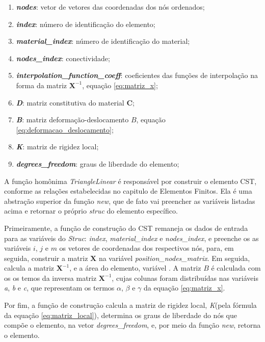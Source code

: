 \begin{enumerate}
    \item \textbf{\emph{nodes}}: vetor de vetores das coordenadas dos nós ordenados;
   \item \textbf{\emph{index}}: número de identificação do elemento;
   \item \textbf{\emph{material\_index}}: número de identificação do material;
   \item \textbf{\emph{nodes\_index}}: conectividade;
   \item \textbf{\emph{interpolation\_function\_coeff}}: coeficientes das funções de interpolação na forma da matriz $\bm{X}^{-1}$, equação \ref{eq:matriz_x};
   \item \textbf{\emph{D}}: matriz constitutiva do material $\bm{C}$;
   \item \textbf{\emph{B}}: matriz deformação-deslocamento $B$, equação \ref{eq:deformacao_deslocamento};
   \item \textbf{\emph{K}}: matriz de rigidez local;
   \item \textbf{\emph{degrees\_freedom}}: graus de liberdade do elemento;
\end{enumerate}

A função homônima \emph{TriangleLinear} é responsável por construir o elemento CST, conforme as relações estabelecidas no capitulo de Elementos Finitos. Ela é uma abstração superior da função \emph{new}, que de fato vai preencher as variáveis listadas acima e retornar o próprio \emph{struc} do elemento específico.

Primeiramente, a função de construção do CST remaneja os dados de entrada para as variáveis do \emph{Struc}: \emph{index}, \emph{material\_index} e \emph{nodes\_index}, e preenche os as variáveis $i$, $j$ e $m$ os vetores de coordenadas dos respectivos nós, para, em seguida, construir a matriz $\bm{X}$ na variável \emph{position\_nodes\_matrix}. Em seguida, calcula a matriz $\bm{X}^{-1}$, e a área do elemento, variável \emph{\Delta}. A matriz $B$ é calculada com os os temos da inversa matriz $\bm{X}^{-1}$, cujas colunas foram distribuídas nas variáveis \emph{a}, \emph{b} e \emph{c}, que representam os termos $\alpha$, $\beta$ e $\gamma$ da equação \ref{eq:matriz_x}. 

Por fim, a função de construção calcula a matriz de rigidez local, \emph{K}(pela fórmula da equação \ref{eq:matriz_local}), determina os graus de liberdade do nós que compõe o elemento, na vetor \emph{degrees\_freedom}, e, por meio da função \emph{new}, retorna o elemento.

